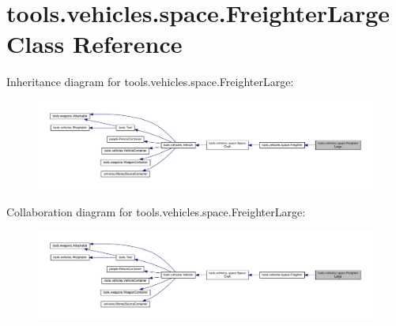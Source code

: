 \hypertarget{classtools_1_1vehicles_1_1space_1_1_freighter_large}{}\section{tools.\+vehicles.\+space.\+Freighter\+Large Class Reference}
\label{classtools_1_1vehicles_1_1space_1_1_freighter_large}


Inheritance diagram for tools.\+vehicles.\+space.\+Freighter\+Large\+:
\nopagebreak
\begin{figure}[H]
\begin{center}
\leavevmode
\includegraphics[width=350pt]{classtools_1_1vehicles_1_1space_1_1_freighter_large__inherit__graph}
\end{center}
\end{figure}


Collaboration diagram for tools.\+vehicles.\+space.\+Freighter\+Large\+:
\nopagebreak
\begin{figure}[H]
\begin{center}
\leavevmode
\includegraphics[width=350pt]{classtools_1_1vehicles_1_1space_1_1_freighter_large__coll__graph}
\end{center}
\end{figure}
